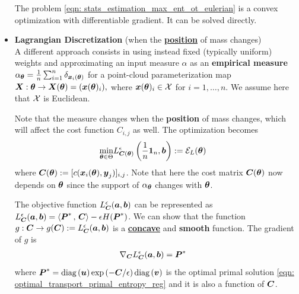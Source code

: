 \documentclass[11pt]{article}
\begin{document}
\begin{itemize}
The problem \eqref{eqn: stats_estimation_max_ent_ot_eulerian} is a convex optimization with differentiable gradient. It can be solved directly. 


\item \textbf{Lagrangian Discretization} (when the \underline{\textbf{position}} of mass changes)\\
A different approach consists in using instead fixed (typically uniform) weights and approximating an input measure $\alpha$ as an \textbf{empirical measure} $\alpha_{\boldsymbol{\theta}} =\frac{1}{n} \sum_{i=1}^{n}\delta_{\boldsymbol{x}_{i}({\boldsymbol{\theta}})}$ for a point-cloud parameterization map $\boldsymbol{X} : \boldsymbol{\theta} \rightarrow  \boldsymbol{X}(\boldsymbol{\theta}) = (\boldsymbol{x}(\boldsymbol{\theta})_i),$ where $\boldsymbol{x}(\boldsymbol{\theta})_i \in {\mathcal X}$ for $i=1,\ldots, n$.  We assume here that ${\mathcal X}$ is Euclidean. 

Note that the measure changes when the \textbf{position} of mass changes, which will affect the cost function $C_{i,j}$ as well. The optimization becomes
\begin{align}
\min_{\boldsymbol{\theta} \in \Theta} & L_{\boldsymbol{C}(\boldsymbol{\theta})}^{\epsilon}\left(\frac{1}{n}\boldsymbol{1}_{n}, \boldsymbol{b}\right) := {\mathcal E}_{L}(\boldsymbol{\theta}) \label{eqn: stats_estimation_max_ent_ot_lagrangian}
\end{align} where $\boldsymbol{C}(\boldsymbol{\theta}) := [c(\boldsymbol{x}_{i}({\boldsymbol{\theta}}), \boldsymbol{y}_{j})]_{i,j}$. Note that here the cost matrix $\boldsymbol{C}(\boldsymbol{\theta})$ now depends on $\boldsymbol{\theta}$ since the support of $\alpha_{\boldsymbol{\theta}}$ changes with $\boldsymbol{\theta}$. 

The objective function $L_{\boldsymbol{C}}^{\epsilon}(\boldsymbol{a}, \boldsymbol{b})$ can be represented as $L_{\boldsymbol{C}}^{\epsilon}(\boldsymbol{a}, \boldsymbol{b}) =\left\langle \boldsymbol{P}^{*}\,,\, \boldsymbol{C} \right\rangle - \epsilon H(\boldsymbol{P}^{*})$. We can show that the function $g: \boldsymbol{C} \rightarrow g(\boldsymbol{C}) := L_{\boldsymbol{C}}^{\epsilon}(\boldsymbol{a}, \boldsymbol{b})$ is a  \underline{\textbf{concave}} and \textbf{smooth} function. The gradient of $g$ is
\begin{align}
\nabla_{\boldsymbol{C}}{L_{\boldsymbol{C}}^{\epsilon}(\boldsymbol{a}, \boldsymbol{b})} &= \boldsymbol{P}^{*} \label{eqn: grad_max_ot_cost}
\end{align} where $ \boldsymbol{P}^{*} = \text{diag}\left(\boldsymbol{u}\right)\exp\left(-\boldsymbol{C}/\epsilon\right)\text{diag}\left(\boldsymbol{v}\right)$ is the optimal primal solution \eqref{eqn: optimal_transport_primal_entropy_reg} and it is also a function of $\boldsymbol{C}$.


\end{itemize}
\end{document}
